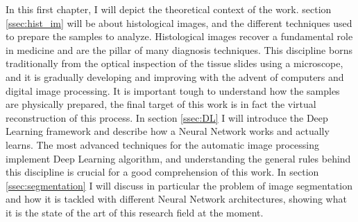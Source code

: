 In this first chapter, I will depict the theoretical context of the work. section \ref{ssec:hist_im} will be about histological images, and the different techniques used to prepare the samples to analyze. Histological images recover a fundamental role in medicine and are the pillar of many diagnosis techniques. This discipline borns traditionally from the optical inspection of the tissue slides using a microscope, and it is gradually developing and improving with the advent of computers and digital image processing. It is important tough to understand how the samples are physically prepared, the final target of this work is in fact the virtual reconstruction of this process. In section \ref{ssec:DL} I will introduce the Deep Learning framework and describe how a Neural Network works and actually learns. The most advanced techniques for the automatic image processing implement Deep Learning algorithm, and understanding the general rules behind this discipline is crucial for a good comprehension of this work. In section \ref{ssec:segmentation} I will discuss in particular the problem of image segmentation and how it is tackled with different Neural Network architectures, showing what it is the state of the art of this research field at the moment.
